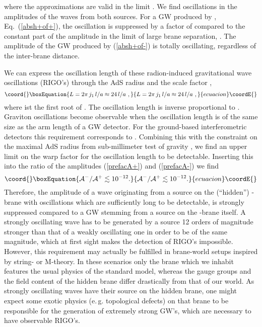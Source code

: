 \documentclass[a4paper,prl,twocolumn,amsmath,amssymb,showpacs]{revtex4}
\begin{document}
where the approximations are valid in the limit \coordHE{}. We find oscillations 
in the amplitudes of the waves from both sources. For a GW produced by \coordHE{}, 
Eq.~(\ref{absh+of+}), the oscillation is suppressed 
by a factor of \coordHE{} compared 
to the constant part of the amplitude in the limit of large brane separation, 
\coordHE{}. The amplitude of the GW produced by \coordHE{} (\ref{absh+of-}) is 
totally oscillating, regardless of the inter-brane distance. 
 
We can express the oscillation length of 
these radion-induced gravitational wave oscillations (RIGO's) through the AdS 
radius \coordHE{} and the scale factor \coordHE{}, 
\begin{equation}\coord{}\boxEquation{ 
L = 2 \pi \, j_1 \, l/a
\approx 24\, l/a\ , 
}{ 
L = 2 \pi \, j_1 \, l/a
\approx 24\, l/a\ , 
}{ecuacion}\coordE{}\end{equation}
where \coordHE{} ist the first root of \coordHE{}.
The oscillation length is inverse proportional to \coordHE{}. Graviton oscillations 
become observable when the oscillation length is of the same size as the 
arm length of a GW detector. For the ground-based interferometric detectors this 
requirement corresponds to \coordHE{}.  Combining this with the 
constraint on the maximal AdS radius \coordHE{} from sub-millimeter test 
of gravity \coordHE{} \cite{Gundlach}, we find an upper limit on the warp 
factor \coordHE{} for the oscillation length to be detectable. 
Inserting this into the ratio of the amplitudes (\ref{prefacA+}) and
(\ref{prefacA-}) we find 
\begin{equation}\coord{}\boxEquation{ 
\mathcal{A}^- / \mathcal{A}^+  \lesssim 10^{-12}. 
}{ 
\mathcal{A}^- / \mathcal{A}^+  \lesssim 10^{-12}. 
}{ecuacion}\coordE{}\end{equation} 
Therefore, the amplitude of a wave originating from a source on the
(``hidden'') \myHighlight{$\Sigma_-$}\coordHE{}-brane with oscillations which are sufficiently long
to be detectable, is strongly suppressed compared to a GW stemming from a
source on the \myHighlight{$\Sigma_+$}\coordHE{}-brane itself.  A strongly oscillating wave has to be
generated by a source 12 orders of magnitude stronger than that of a weakly
oscillating one in order to be of the same magnitude, which at first sight
makes the detection of RIGO's impossible. However, this requirement may
actually be fulfilled in brane-world setups inspired by string- or M-theory.
In these scenarios only the brane which we inhabit features the usual physics
of the standard model, whereas the gauge groups and the field content of the
hidden brane differ drastically from that of our world. As strongly
oscillating waves have their source on the hidden brane, one might expect some
exotic physics (e.\,g. topological defects) on that brane to be responsible
for the generation of extremely strong GW's, which are necessary to have
observable RIGO's.
 
\end{document}
